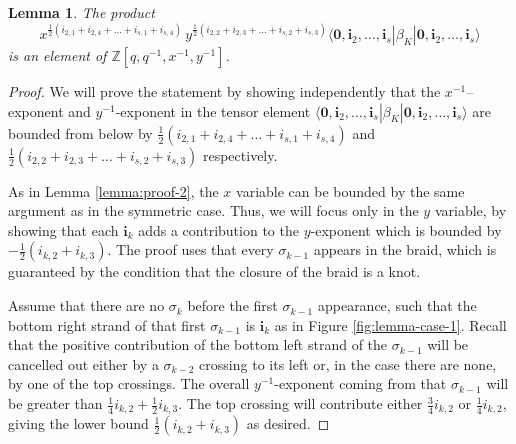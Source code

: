 \documentclass[12pt,oneside,reqno]{amsart}
\newtheorem{lema}{\bf Lemma}
\numberwithin{teorema}{section}
\numberwithin{definicion}{section}
\numberwithin{lema}{section}
\numberwithin{conjetura}{section}
\numberwithin{proposicion}{section}
\begin{document}
\begin{lema}\label{lemma:proof-3} The product $$x^{\frac12\left(i_{2,1}+i_{2,4}+\dots+i_{s,1}+i_{s,4}\right)}\,y^{\frac12\left(i_{2,2}+i_{2,3}+\dots+i_{s,2}+i_{s,3}\right)}\langle \textbf{0},\textbf{i}_2,\dots,\textbf{i}_s|\beta_K|\textbf{0},\textbf{i}_2,\dots,\textbf{i}_s\rangle$$ is an element of $\mathbb{Z}[q,q^{-1},x^{-1},y^{-1}]$.
\end{lema}

\begin{proof} 
We will prove the statement by showing independently that the $x^{-1}$--exponent and $y^{-1}$-exponent in the tensor element $\langle \textbf{0},\textbf{i}_2,\dots,\textbf{i}_s|\beta_K|\textbf{0},\textbf{i}_2,\dots,\textbf{i}_s\rangle$ are bounded from below by $\frac12\left(i_{2,1}+i_{2,4}+\dots+i_{s,1}+i_{s,4}\right)$ and $\frac12\left(i_{2,2}+i_{2,3}+\dots+i_{s,2}+i_{s,3}\right)$ respectively.

As in Lemma \ref{lemma:proof-2}, the $x$ variable can be bounded by the same argument as in the symmetric case. Thus, we will focus only in the $y$ variable, by showing that each $\textbf{i}_k$ adds a contribution to the $y$-exponent which is bounded by $-\frac12\left(i_{k,2}+i_{k,3}\right)$. The proof uses that every $\sigma_{k-1}$ appears in the braid, which is guaranteed by the condition that the closure of the braid is a knot.

Assume that there are no $\sigma_{k}$ before the first $\sigma_{k-1}$ appearance, such that the bottom right strand of that first $\sigma_{k-1}$ is $\textbf{i}_k$ as in Figure \ref{fig:lemma-case-1}. Recall that the positive contribution of the bottom left strand of the $\sigma_{k-1}$ will be cancelled out either by a $\sigma_{k-2}$ crossing to its left or, in the case there are none, by one of the top crossings. The overall $y^{-1}$-exponent coming from that $\sigma_{k-1}$ will be greater than $\frac14 i_{k,2}+\frac12i_{k,3}$. The top crossing will contribute either $\frac34 i_{k,2}$ or $\frac14 i_{k,2}$, giving the lower bound $\frac12\left(i_{k,2}+i_{k,3}\right)$ as desired.


\end{proof}
\end{document}
